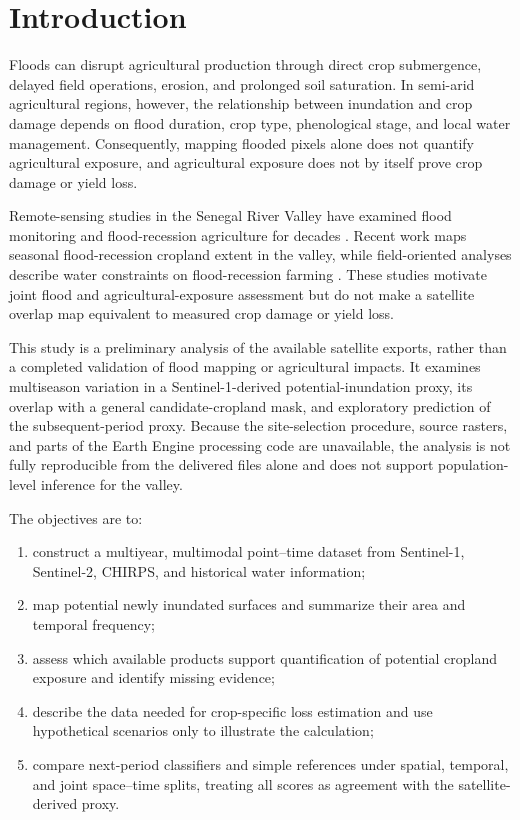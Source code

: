 \documentclass[pdflatex,sn-mathphys,Numbered]{sn-jnl}
\begin{document}
\maketitle

\section{Introduction}
Floods can disrupt agricultural production through direct crop submergence, delayed field operations, erosion, and prolonged soil saturation. In semi-arid agricultural regions, however, the relationship between inundation and crop damage depends on flood duration, crop type, phenological stage, and local water management. Consequently, mapping flooded pixels alone does not quantify agricultural exposure, and agricultural exposure does not by itself prove crop damage or yield loss.

Remote-sensing studies in the Senegal River Valley have examined flood monitoring and flood-recession agriculture for decades \cite{sandholt2003,saarnak2003}. Recent work maps seasonal flood-recession cropland extent in the valley, while field-oriented analyses describe water constraints on flood-recession farming \cite{bruckmann2025,sall2020}. These studies motivate joint flood and agricultural-exposure assessment but do not make a satellite overlap map equivalent to measured crop damage or yield loss.

This study is a preliminary analysis of the available satellite exports, rather than a completed validation of flood mapping or agricultural impacts. It examines multiseason variation in a Sentinel-1-derived potential-inundation proxy, its overlap with a general candidate-cropland mask, and exploratory prediction of the subsequent-period proxy. Because the site-selection procedure, source rasters, and parts of the Earth Engine processing code are unavailable, the analysis is not fully reproducible from the delivered files alone and does not support population-level inference for the valley.

The objectives are to:
\begin{enumerate}
  \item construct a multiyear, multimodal point--time dataset from Sentinel-1, Sentinel-2, CHIRPS, and historical water information;
  \item map potential newly inundated surfaces and summarize their area and temporal frequency;
  \item assess which available products support quantification of potential cropland exposure and identify missing evidence;
  \item describe the data needed for crop-specific loss estimation and use hypothetical scenarios only to illustrate the calculation;
  \item compare next-period classifiers and simple references under spatial, temporal, and joint space--time splits, treating all scores as agreement with the satellite-derived proxy.
\end{enumerate}
\end{document}

